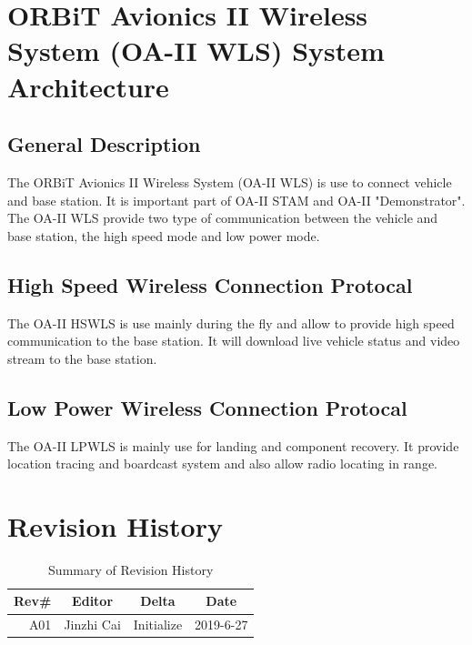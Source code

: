 \documentclass[12pt,article]{memoir}
\begin{document}
\chapter{ORBiT Avionics II Wireless System (OA-II WLS) System Architecture}
\section{General Description}
The ORBiT Avionics II Wireless System (OA-II WLS) is use to connect vehicle and base station. It is important part of OA-II STAM and OA-II "Demonstrator". The OA-II WLS provide two type of communication between the vehicle and base station, the high speed mode and low power mode.
\section{High Speed Wireless Connection Protocal}
The OA-II HSWLS is use mainly during the fly and allow to provide high speed communication to the base station. It will download live vehicle status and video stream to the base station.
\section{Low Power Wireless Connection Protocal}
The OA-II LPWLS is mainly use for landing and component recovery. It provide location tracing and boardcast system and also allow radio locating in range.

\chapter{Revision History}
\begin{table}[H]
	\centering
	\begin{tabu}{r || c | c | c }
		Rev\# & Editor & Delta & Date\\ \hline
		A01 & Jinzhi Cai & Initialize  & 2019-6-27\\
	\end{tabu}
	\caption{Summary of Revision History}
	\label{tab:edatools}
\end{table}
\end{document}
